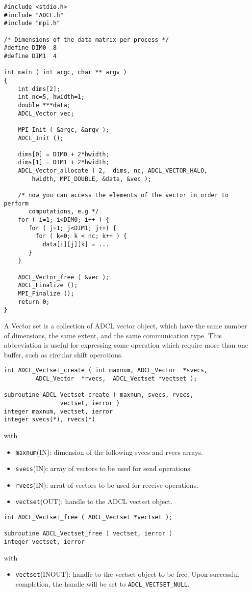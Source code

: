\begin{verbatim}
#include <stdio.h>
#include "ADCL.h"
#include "mpi.h"

/* Dimensions of the data matrix per process */
#define DIM0  8
#define DIM1  4

int main ( int argc, char ** argv ) 
{
    int dims[2];
    int nc=5, hwidth=1;
    double ***data;
    ADCL_Vector vec;
    
    MPI_Init ( &argc, &argv );
    ADCL_Init ();
    
    dims[0] = DIM0 + 2*hwidth;
    dims[1] = DIM1 + 2*hwidth;
    ADCL_Vector_allocate ( 2,  dims, nc, ADCL_VECTOR_HALO, 
        hwidth, MPI_DOUBLE, &data, &vec );
    
    /* now you can access the elements of the vector in order to perform 
       computations, e.g */
    for ( i=1; i<DIM0; i++ ) {
       for ( j=1; j<DIM1; j++) {
         for ( k=0; k < nc; k++ ) {
           data[i][j][k] = ...
       }
    }
    
    ADCL_Vector_free ( &vec );        
    ADCL_Finalize ();
    MPI_Finalize ();
    return 0;
}
\end{verbatim}

A Vector set is a collection of ADCL vector object, which have the same number
of dimensions, the same extent, and the same communication type. This
abbreviation is useful for expressing some operation which require more than
one buffer, such as circular shift operations.

\begin{verbatim}
int ADCL_Vectset_create ( int maxnum, ADCL_Vector  *svecs,
         ADCL_Vector  *rvecs,  ADCL_Vectset *vectset );

subroutine ADCL_Vectset_create ( maxnum, svecs, rvecs, 
                vectset, ierror )
integer maxnum, vectset, ierror
integer svecs(*), rvecs(*)
\end{verbatim}
with
\begin{itemize}
\item {\tt maxnum}(IN): dimension of the following svecs and rvecs arrays.
\item {\tt svecs}(IN): array of vectors to be used for send operations
\item {\tt rvecs}(IN): arrat of vectors to be used for receive operations.
\item {\tt vectset}(OUT):  handle to the ADCL vectset object.
\end{itemize}

\begin{verbatim}
int ADCL_Vectset_free ( ADCL_Vectset *vectset );

subroutine ADCL_Vectset_free ( vectset, ierror )
integer vectset, ierror
\end{verbatim}
with
\begin{itemize}
\item {\tt vectset}(INOUT): handle to the vectset object to be free. Upon
  successful completion, the handle will be set to {\tt ADCL\_VECTSET\_NULL}.
\end{itemize}

